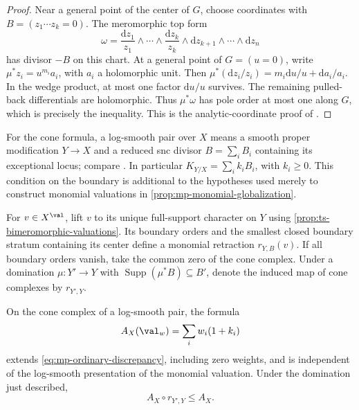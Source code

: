 \begin{proof}
Near a general point of the center of $G$, choose coordinates
with $B=(z_1\cdots z_k=0)$. The meromorphic top form
\[
 \omega=\frac{\mathrm{d}z_1}{z_1}\wedge\cdots\wedge
 \frac{\mathrm{d}z_k}{z_k}\wedge
 \mathrm{d}z_{k+1}\wedge\cdots\wedge\mathrm{d}z_n
\]
has divisor $-B$ on this chart. At a general point of $G=(u=0)$,
write $\mu^*z_i=u^{m_i}a_i$, with $a_i$ a holomorphic unit.
Then
$\mu^*(\mathrm{d}z_i/z_i)=m_i\mathrm{d}u/u+
\mathrm{d}a_i/a_i$. In the wedge product, at most one
factor $\mathrm{d}u/u$ survives. The remaining pulled-back
differentials are holomorphic. Thus $\mu^*\omega$ has pole
order at most one along $G$, which is precisely the inequality.
This is the analytic-coordinate proof of
\cite[Lemma~1.5(i), pp.~2156--2157]{JM12}.
\end{proof}

For the cone formula, a log-smooth pair over $X$ means a smooth
proper modification $Y\to X$ and a reduced snc divisor
$B=\sum_i B_i$ containing its exceptional locus; compare
\cite[Definition~3.2, p.~2168]{JM12}. In particular
$K_{Y/X}=\sum_i k_iB_i$, with $k_i\geq0$. This condition
on the boundary is additional to the hypotheses used merely
to construct monomial valuations in
\cref{prop:mp-monomial-globalization}.

For $v\in X^{\val}$, lift $v$ to its unique full-support
character on $Y$ using \cref{prop:ts-bimeromorphic-valuations}.
Its boundary orders and the smallest closed boundary stratum
containing its center define a monomial retraction $r_{Y,B}(v)$.
If all boundary orders vanish, take the common zero of the cone
complex. Under a domination $\mu:Y'\to Y$ with
$\operatorname{Supp}(\mu^*B)\subseteq B'$, denote the induced
map of cone complexes by $r_{Y',Y}$.

\begin{samepage}
\begin{proposition}\label{prop:mp-monomial-discrepancy}
On the cone complex of a log-smooth pair, the formula
\[
                  A_X(\val_w)=\sum_i w_i(1+k_i)
\]
extends \eqref{eq:mp-ordinary-discrepancy}, including zero
weights, and is independent of the log-smooth presentation
of the monomial valuation. Under the domination just described,
\[
                         A_X\circ r_{Y',Y}\leq A_X.
\tag{59.21}\label{eq:mp-discrepancy-monotonicity}
\]
\end{proposition}
\end{samepage}

